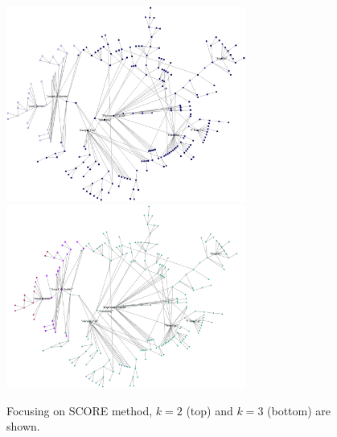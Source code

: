 \documentclass{article}
\numberwithin{equation}{section}
\begin{document}
\begin{figure}[H]
	\centering
	\includegraphics[width=0.7\textwidth]{trend/giantcoau-score-2.png}
	\includegraphics[width=0.7\textwidth]{trend/giantcoau-score-3.png}
	\caption{Focusing on SCORE method, $k=2$ (top) and $k=3$ (bottom) are shown.}
\end{figure}
\end{document}
